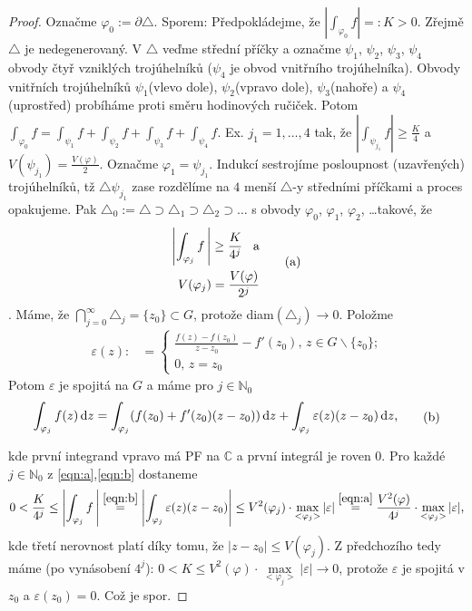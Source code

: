 \begin{proof}
Označme $\varphi_0:=\partial\triangle$. Sporem: Předpokládejme, že $|\int_{\varphi_0}f|=:K>0$. Zřejmě $\triangle$ je nedegenerovaný. V  $\triangle$ veďme střední příčky a označme $\psi_1$, $\psi_2$, $\psi_3$, $\psi_4$ obvody čtyř vzniklých trojúhelníků ($\psi_4$ je obvod vnitřního trojúhelníka). Obvody vnitřních trojúhelníků $\psi_1$(vlevo dole),  $\psi_2$(vpravo dole), $\psi_3$(nahoře) a  $\psi_4$(uprostřed) probíháme proti směru hodinových ručiček.
Potom $\int_{\varphi_0}f=\int_{\psi_1}f+\int_{\psi_2}f+\int_{\psi_3}f+\int_{\psi_4}f$. Ex. $j_1=1, \ldots, 4$ tak, že $|\int_{\psi_{j_1}}f|\ge \frac{K}{4}$ a $V({\psi_{j_1}})= \frac{V(\varphi)}{2}$.
Označme $\varphi_1=\psi_{j_1}$. Indukcí sestrojíme posloupnost (uzavřených) trojúhelníků, tž $\triangle \psi_{j_1}$ zase rozdělíme na $4$ menší $\triangle$-y středními příčkami a proces opakujeme. Pak 
$\triangle_0:=\triangle \supset \triangle_1 \supset \triangle_2 \supset \ldots$ s obvody $\varphi_0$, $\varphi_1$, $\varphi_2$, \ldots takové, že \begin{equation}
\begin{aligned}
        \left|\int_{\varphi_j}f\, \right|\ge \frac{K}{4^j} \text{\hspace{3mm}a}\\ V({\varphi_j})= \frac{V(\varphi)}{2^j}
\end{aligned}
\tag{a}
\label{eqn:a}
\end{equation}. Máme, že $\bigcap\limits_{j=0}^\infty \triangle_j=\{z_0\} \subset G$, %
protože diam$(\triangle_j)\rightarrow 0$. Položme
$$\begin{aligned}
\varepsilon(z): &=
\left\{
	\begin{array}{ll}
		\frac{f(z)-f(z_0)}{z-z_0}-f'(z_0) \text{, } z \in G \backslash \{z_0\} \text{;}\\
		0  \text{, } z=z_0
	\end{array}
\right.
\end{aligned}
$$
Potom $\varepsilon$ je spojitá na $G$ a máme pro $j \in \mathbb{N}_0$
\begin{equation}
    \begin{aligned}
    \int_{\varphi_j}f(z) \mathop{}\!\mathrm{d} z = \int_{\varphi_j}(f(z_0)+f'(z_0)(z-z_0)) \mathop{}\!\mathrm{d} z + \int_{\varphi_j}\varepsilon(z)(z-z_0) \mathop{}\!\mathrm{d} z \text{,}
    \end{aligned}
    \tag{b}
    \label{eqn:b}
\end{equation}

kde první integrand vpravo má PF na $\mathbb{C}$ a první integrál je roven $0$. Pro každé $j \in \mathbb{N}_0$ z  \cref{eqn:a},\cref{eqn:b} dostaneme
$$
0<\frac{K}{4^j} \le \left| \int_{\varphi_j}f\,\right|\stackrel{\cref{eqn:b}}{=} \left|\int_{\varphi_j}\varepsilon(z)(z-z_0)\right| \le V^2(\varphi_j) \cdot \max_{<\varphi_j>}|\varepsilon|\overset{\cref{eqn:a}}{=}\frac{V^2(\varphi)}{4^j}\cdot \max_{<\varphi_j>}|\varepsilon| \text{,}
$$
kde třetí nerovnost platí díky tomu, že $|z-z_0| \le V(\varphi_j)$. Z předchozího tedy máme (po vynásobení $4^j$): $0<K \le V^2(\varphi) \cdot \max\limits_{<\varphi_j>}|\varepsilon| \rightarrow 0$, protože $\varepsilon$ je spojitá v $z_0$ a $\varepsilon(z_0)=0$. Což je spor.
\end{proof}
